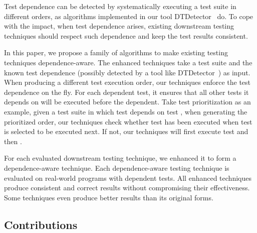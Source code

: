 Test dependence can be detected by systematically
executing a test suite in different orders, as algorithms implemented
in our tool DTDetector~\cite{testdependence} do. To cope
with the impact, when test dependence arises, existing downstream
testing techniques should respect such dependence and
keep the test results consistent. 

In this paper, we propose a family of
algorithms to make existing testing techniques dependence-aware.
The enhanced techniques take a test suite and the known
test dependence (possibly detected by a tool like DTDetector~\cite{testdependence}) as input. When producing a different test
execution order, our techniques enforce the test dependence
on the fly. For each dependent test, it ensures
that all other tests it depends on will be executed
before the dependent. Take test prioritization
as an example, given
a test suite in which test  depends on test ,
when generating the prioritized order, our techniques check
whether test  has been executed when test 
is selected to be executed next. If not, our techniques
will first execute test  and then .



For each evaluated downstream testing technique, we enhanced it
to form a dependence-aware technique. Each dependence-aware
testing technique is evaluated on real-world programs with dependent
tests. 
All enhanced techniques produce consistent and correct results without
compromising their effectiveness. Some techniques even produce
better results than its original forms.

\subsection{Contributions}

